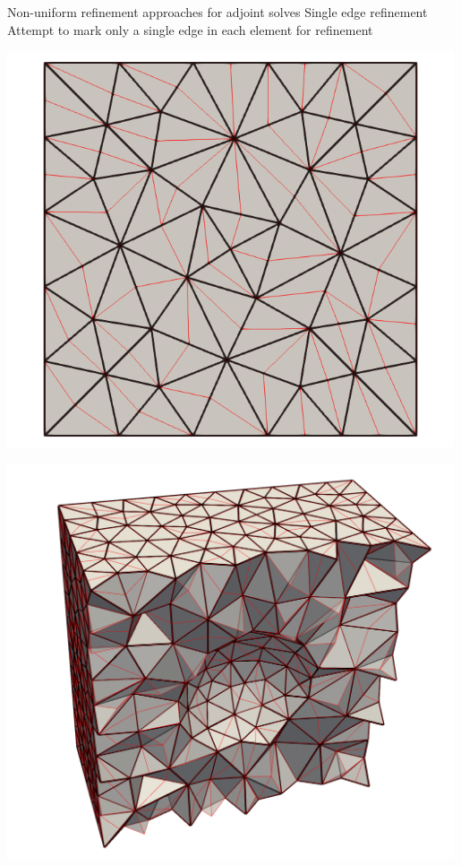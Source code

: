 \documentclass[fleqn]{beamer}
\begin{document}

\begin{frame}{Non-uniform refinement approaches for adjoint solves}
{Single edge refinement}
Attempt to mark only a single edge in each element for refinement
\begin{minipage}{0.5\textwidth}
\centering
\includegraphics[width=0.99\textwidth]{../img/refine_single_mesh}
\end{minipage}%
\begin{minipage}{0.5\textwidth}
\centering
\includegraphics[width=0.99\textwidth]{../img/refine_single_mesh_3D}
\end{minipage}
\end{frame}
\end{document}
